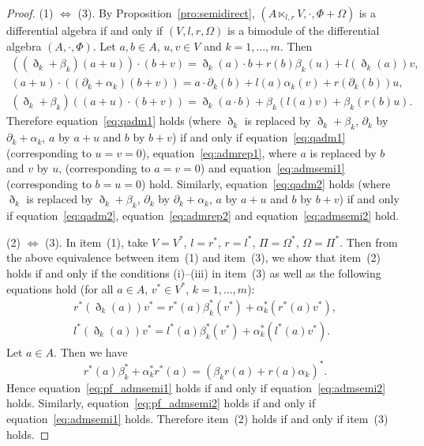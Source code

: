 \documentclass[10pt,a4paper]{amsart}
\numberwithin{equation}{section}
\begin{document}
\begin{proof}
 (1) $\iff$ (3).
 By Proposition~\ref{pro:semidirect}, $(A \ltimes_{l,r} V, \cdot, \Phi + \Omega)$ is a differential algebra if and only if
 $(V, l, r, \Omega)$ is a bimodule of the differential algebra $(A, \cdot, \Phi)$.
 Let $a, b \in A$, $u, v \in V$ and $k=1, \dots, m$. Then
 \begin{gather*}
 ((\eth_k + \beta_k)(a + u)) \cdot (b + v) = \eth_k(a) \cdot b + r(b)\beta_k(u) + l(\eth_k(a)) v, \\
 (a + u) \cdot ((\partial_k + \alpha_k)(b + v)) = a \cdot \partial_k(b) + l(a)\alpha_k(v) + r(\partial_k(b)) u, \\
 (\eth_k + \beta_k)((a + u)\cdot (b + v)) = \eth_k(a \cdot b) + \beta_k(l(a)v) + \beta_k(r(b)u).
 \end{gather*}
 Therefore equation~\eqref{eq:qadm1} holds (where $\eth_k$ is replaced by $\eth_k + \beta_k$, $\partial_k$ by $\partial_k + \alpha_k$, $a$ by $a + u$ and $b$ by $b + v$)
 if and only if equation~\eqref{eq:qadm1} (corresponding to $u = v = 0$), equation~\eqref{eq:admrep1}, where $a$ is replaced by $b$ and $v$ by $u$, (corresponding to $a = v = 0$) and equation~\eqref{eq:admsemi1} (corresponding to $b = u =0$) hold.
 Similarly, equation~\eqref{eq:qadm2} holds (where $\eth_k$ is replaced by $\eth_k + \beta_k$, $\partial_k$ by $\partial_k + \alpha_k$, $a$ by $a + u$ and $b$ by $b + v$)
 if and only if equation~\eqref{eq:qadm2}, equation~\eqref{eq:admrep2} and equation~\eqref{eq:admsemi2} hold.

 (2) $\iff$ (3).
 In item~(1), take $V = V^*$, $l = r^*$, $r = l^*$, $\Pi = \Omega^*$, $\Omega = \Pi^*$.
 Then from the above equivalence between item~(1) and item~(3),
 we show that item~(2) holds if and only if the conditions (i)--(iii) in item~(3)
 as well as the following equations hold (for all $a \in A$, $v^* \in V^*$, $k=1, \dots, m$):
 \begin{gather}
 r^*(\eth_k(a)) v^* = r^*(a) \beta_k^*(v^*) + \alpha_k^* (r^*(a)v^*), \label{eq:pf_admsemi1} \\
 l^*(\eth_k(a)) v^* = l^*(a) \beta_k^*(v^*) + \alpha_k^* (l^*(a)v^*). \label{eq:pf_admsemi2}
 \end{gather}
	Let $a \in A$. Then we have
	\begin{equation*}
		r^*(a) \beta_k^* + \alpha_k^* r^*(a) = ( \beta_k r(a) + r(a) \alpha_k)^*.
	\end{equation*}
	Hence equation~\eqref{eq:pf_admsemi1} holds if and only if equation~\eqref{eq:admsemi2} holds.
	Similarly, equation~\eqref{eq:pf_admsemi2} holds if and only if equation~\eqref{eq:admsemi1} holds.
	Therefore item~(2) holds if and only if item~(3) holds.
\end{proof}
\end{document}
